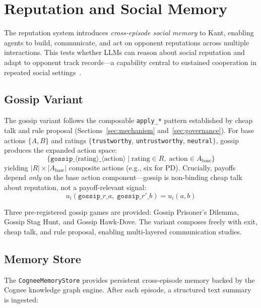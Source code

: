 
\section{Reputation and Social Memory}
\label{sec:reputation}

The reputation system introduces \emph{cross-episode social memory} to Kant,
enabling agents to build, communicate, and act on opponent reputations across
multiple interactions. This tests whether LLMs can reason about social
reputation and adapt to opponent track records---a capability central to
sustained cooperation in repeated social
settings~\citep{nowak2005evolution,axelrod1984evolution}.

\subsection{Gossip Variant}
\label{sec:gossip}

The gossip variant follows the composable \texttt{apply\_*} pattern established
by cheap talk and rule proposal (Sections~\ref{sec:mechanism}
and~\ref{sec:governance}). For base actions $\{A, B\}$ and ratings
$\{$\texttt{trustworthy}, \texttt{untrustworthy}, \texttt{neutral}$\}$,
gossip produces the expanded action space:
\[
\bigl\{\texttt{gossip\_}\langle\text{rating}\rangle\texttt{\_}\langle\text{action}\rangle
\;\big|\; \text{rating} \in R,\; \text{action} \in A_{\text{base}}\bigr\}
\]
yielding $|R| \times |A_{\text{base}}|$ composite actions (e.g., six for PD).
Crucially, payoffs depend \emph{only} on the base action component---gossip is
non-binding cheap talk about reputation, not a payoff-relevant signal:
\[
u_i(\texttt{gossip\_}r\texttt{\_}a,\; \texttt{gossip\_}r'\texttt{\_}b) = u_i(a, b)
\]

Three pre-registered gossip games are provided: Gossip Prisoner's Dilemma,
Gossip Stag Hunt, and Gossip Hawk-Dove. The variant composes freely with exit,
cheap talk, and rule proposal, enabling multi-layered communication studies.

\subsection{Memory Store}
\label{sec:memory-store}

The \texttt{CogneeMemoryStore} provides persistent cross-episode memory backed
by the Cognee knowledge graph engine. After each episode, a structured text
summary is ingested:


